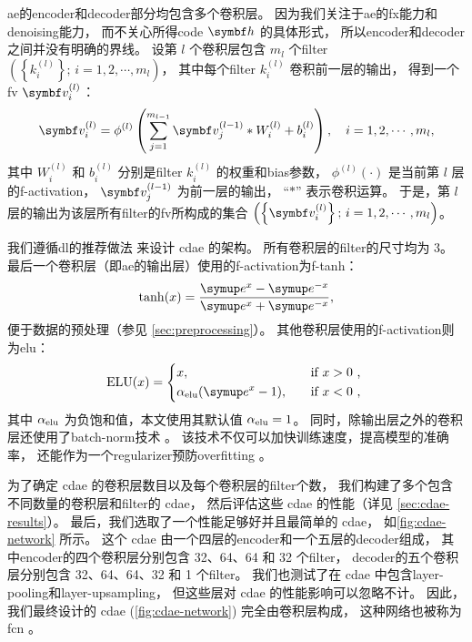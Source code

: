 \ac{ae}的\ac{encoder}和\ac{decoder}部分均包含多个卷积层。
因为我们关注于\ac{ae}的\ac{fx}能力和\ac{denoising}能力，
而不关心所得\ac{code} $\B{h}$ 的具体形式，
所以\ac{encoder}和\ac{decoder}之间并没有明确的界线。
设第 $l$ 个卷积层包含 $m_l$ 个\ac{filter}
$\left(\left\{ k_{i}^{(l)} \right\};\, i = 1, 2, \cdots, m_l \right)$，
其中每个\ac{filter} $k_{i}^{(l)}$ 卷积前一层的输出，
得到一个\ac{fv} $\B{v}_{i}^{(l)}$：
\begin{equation}
  \label{eq:conv}
  \B{v}_{i}^{(l)} = \phi^{(l)} \left( \sum_{j=1}^{m_{l-1}}
    \B{v}_{j}^{(l-1)} * W_i^{(l)} + b_i^{(l)} \right) ,
    \quad i = 1, 2, \cdots, m_{l} ,
\end{equation}
其中
$W_i^{(l)}$ 和 $b_i^{(l)}$ 分别是\ac{filter} $k_{i}^{(l)}$
的权重和\ac{bias}参数，
$\phi^{(l)}(\cdot)$ 是当前第 $l$ 层的\ac{f-activation}，
$\B{v}_{j}^{(l-1)}$ 为前一层的输出，
\enquote{$*$} 表示卷积运算。
于是，第 $l$ 层的输出为该层所有\ac{filter}的\ac{fv}所构成的集合
$\left(\left\{ \B{v}_{i}^{(l)} \right\};\, i = 1, 2, \cdots, m_l \right)$。

我们遵循\ac{dl}的推荐做法\cite{geron2017,suganuma2018} 来设计 \ac{cdae} 的架构。
所有卷积层的\ac{filter}的尺寸均为 3。
最后一个卷积层（即\ac{ae}的输出层）使用的\ac{f-activation}为\ac{f-tanh}：
\begin{equation}
  \tanh(x) = \frac{\Ce^x - \Ce^{-x}}{\Ce^x + \Ce^{-x}} ,
\end{equation}
便于数据的预处理（参见 \autoref{sec:preprocessing}）。
其他卷积层使用的\ac{f-activation}则为\ac{elu}\cite{clevert2016}：
\begin{equation}
  \text{ELU}(x) =
    \begin{dcases*}
      x , \quad & if $x > 0$ , \\
      \alpha_{\R{elu}} (\Ce^x - 1) , \quad & if $x < 0$ ,
    \end{dcases*}
\end{equation}
其中 $\alpha_{\mathrm{elu}}$ 为负饱和值，本文使用其默认值 $\alpha_{\mathrm{elu}} = 1$。
同时，除输出层之外的卷积层还使用了\ac{batch-norm}技术 \cite{ioffe2015}。
该技术不仅可以加快训练速度，提高模型的准确率，
还能作为一个\ac{regularizer}预防\ac{overfitting} \cite{geron2017}。

为了确定 \ac{cdae} 的卷积层数目以及每个卷积层的\ac{filter}个数，
我们构建了多个包含不同数量的卷积层和\ac{filter}的 \ac{cdae}，
然后评估这些 \ac{cdae} 的性能（详见 \autoref{sec:cdae-results}）。
最后，我们选取了一个性能足够好并且最简单的 \ac{cdae}，
如\autoref{fig:cdae-network} 所示。
这个 \ac{cdae} 由一个四层的\ac{encoder}和一个五层的\ac{decoder}组成，
其中\ac{encoder}的四个卷积层分别包含 32、64、64 和 32 个\ac{filter}，
\ac{decoder}的五个卷积层分别包含 32、64、64、32 和 1 个\ac{filter}。
我们也测试了在 \ac{cdae} 中包含\ac{layer-pooling}和\ac{layer-upsampling}，
但这些层对 \ac{cdae} 的性能影响可以忽略不计。
因此，我们最终设计的 \ac{cdae} (\autoref{fig:cdae-network}) 完全由卷积层构成，
这种网络也被称为\ac{fcn} \cite{long2015,springenberg2015}。

